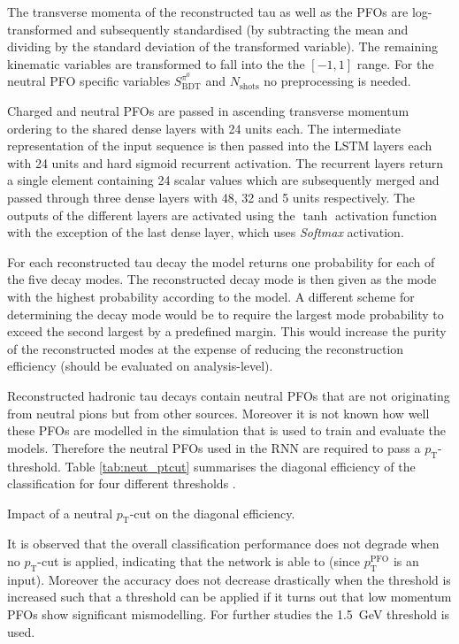  The transverse momenta of the reconstructed tau as
well as the PFOs are log-transformed and subsequently standardised (by
subtracting the mean and dividing by the standard deviation of the transformed
variable). The remaining kinematic variables are transformed to fall into the
the $[-1, 1]$ range. For the neutral PFO specific variables
$S_\text{BDT}^{\pi^0}$ and $N_\text{shots}$ no preprocessing is needed.

Charged and neutral PFOs are passed in ascending transverse momentum ordering to
the shared dense layers with 24 units each. The intermediate representation of
the input sequence is then passed into the LSTM layers each with 24 units and
hard sigmoid recurrent activation. The recurrent layers return a single element
containing 24 scalar values which are subsequently merged and passed through
three dense layers with 48, 32 and 5 units respectively. The outputs of the
different layers are activated using the $\tanh$ activation function with the
exception of the last dense layer, which uses \emph{Softmax} activation.

For each reconstructed tau decay the model returns one probability for each of
the five decay modes. The reconstructed decay mode is then given as the mode
with the highest probability according to the model. A different scheme for
determining the decay mode would be to require the largest mode probability to
exceed the second largest by a predefined margin. This would increase the purity
of the reconstructed modes at the expense of reducing the reconstruction
efficiency (should be evaluated on analysis-level).

Reconstructed hadronic tau decays contain neutral PFOs that are not originating
from neutral pions but from other sources. Moreover it is not known how well
these PFOs are modelled in the simulation that is used to train and evaluate the
models. Therefore the neutral PFOs used in the RNN are required to pass a
$p_\text{T}$-threshold. Table \ref{tab:neut_ptcut} summarises the diagonal
efficiency of the classification for four different thresholds .
\begin{table}[htb]
  \centering
  
  \caption{Impact of a neutral $p_\text{T}$-cut on the diagonal
    efficiency.}
  \label{tab:neut_ptcut}
\end{table}
It is observed that the overall classification performance does not degrade when
no $p_\text{T}$-cut is applied, indicating that the network is able to (since
$p_\text{T}^\text{PFO}$ is an input). Moreover the accuracy does not decrease
drastically  when the threshold is increased such that a
threshold can be applied if it turns out that low momentum PFOs show significant
mismodelling. For further studies the \SI{1.5}{\giga\electronvolt} threshold is
used.

